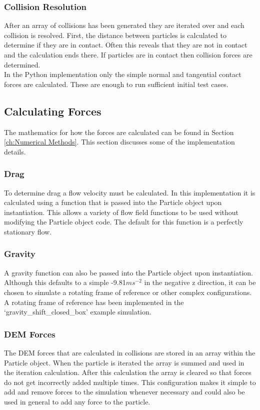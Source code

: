 \documentclass[10pt,a4paper,titlepage]{report}
\begin{document}
\subsubsection{Collision Resolution}
After an array of collisions has been generated they are iterated over and each collision is resolved. First, the distance between particles is calculated to determine if they are in contact. Often this reveals that they are not in contact and the calculation ends there. If particles are in contact then collision forces are determined.
\\In the Python implementation only the simple normal and tangential contact forces are calculated. These are enough to run sufficient initial test cases.
\subsection{Calculating Forces}
The mathematics for how the forces are calculated can be found in Section \ref{ch:Numerical Methods}. This section discusses some of the implementation details.
\subsubsection{Drag}
To determine drag a flow velocity must be calculated. In this implementation it is calculated using a function that is passed into the Particle object upon instantiation. This allows a variety of flow field functions to be used without modifying the Particle object code. The default for this function is a perfectly stationary flow.
\subsubsection{Gravity}
A gravity function can also be passed into the Particle object upon instantiation. Although this defaults to a simple -9.81$ms^{-2}$ in the negative z direction, it can be chosen to simulate a rotating frame of reference or other complex configurations. A rotating frame of reference has been implemented in the `gravity\_shift\_closed\_box' example simulation\cite{DEMApples}.
\subsubsection{DEM Forces}
The DEM forces that are calculated in collisions are stored in an array within the Particle object. When the particle is iterated the array is summed and used in the iteration calculation. After this calculation the array is cleared so that forces do not get incorrectly added multiple times. This configuration makes it simple to add and remove forces to the simulation whenever necessary and could also be used in general to add any force to the particle.
\end{document}
